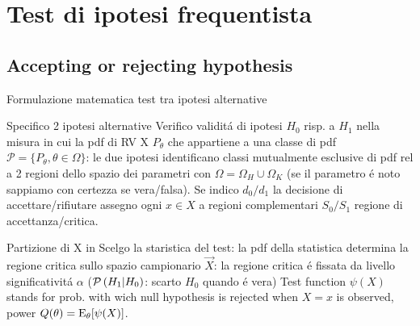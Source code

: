 \documentclass[asd-beamer.tex]{subfiles}%
\begin{document}
	
\section{Test di ipotesi frequentista}


\subsection{Accepting or rejecting hypothesis}
	
\begin{frame}{Formulazione matematica test tra ipotesi alternative}\frameintoc
\begin{block}{Specifico 2 ipotesi alternative}
Verifico validit\'a di ipotesi $H_0$ risp. a $H_1$ nella misura in cui la pdf di RV X $P_{\theta}$ che appartiene a una classe di pdf $\mathcal{P}=\{P_{\theta}, \theta\in\Omega\}$: le due ipotesi identificano classi mutualmente esclusive di pdf rel a 2 regioni dello spazio dei parametri con $\Omega=\Omega_H\cup\Omega_K$ (se il parametro \'e noto sappiamo con certezza se vera/falsa). Se indico $d_0/d_1$ la decisione di accettare/rifiutare assegno ogni $x\in X$ a regioni complementari $S_0/S_1$ regione di accettanza/critica.
\end{block}
\begin{block}{Partizione di X in }
Scelgo la staristica del test: la pdf della statistica determina la regione critica sullo spazio campionario $\vec{X}$: la regione critica \'e fissata da livello significativit\'a $\alpha$ ($\operatorname{\mathcal{P}}{(H_1|H_0)}$: scarto $H_0$ quando \'e vera)
Test function $\psi(X)$ stands for prob. with wich null hypothesis is rejected when $X=x$ is observed, power $Q(\theta)=\operatorname{E}_{\theta}[\psi(X)]$.
\end{block}
\end{frame}
\end{document}
